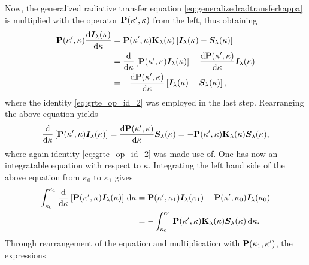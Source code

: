 \documentclass[a4paper,12pt]{report}
\begin{document}
Now, the generalized radiative transfer equation \cref{eq:generalizedradtransferkappa} is multiplied with the operator $\boldsymbol{\mathbf{P}}(\kappa^\prime, \kappa)$ from the left, thus obtaining \begin{align}
\begin{aligned}
\boldsymbol{\mathbf{P}}(\kappa^\prime,\kappa)\frac{\mathrm{d}\bm{I}_\lambda(\kappa)}{\mathrm{d}\kappa} &= \boldsymbol{\mathbf{P}}(\kappa^\prime,\kappa)\boldsymbol{\mathbf{K}}_\lambda(\kappa)\left[\bm{I}_\lambda(\kappa)-\bm{S}_\lambda(\kappa)\right] \\
&= \frac{\mathrm{d}}{\mathrm{d}\kappa}\left[\boldsymbol{\mathbf{P}}(\kappa^\prime,\kappa)\bm{I}_\lambda(\kappa)\right] - \frac{\mathrm{d}\boldsymbol{\mathbf{P}}(\kappa^\prime,\kappa)}{\mathrm{d}\kappa}\bm{I}_\lambda(\kappa) \\
&= -\frac{\mathrm{d}\boldsymbol{\mathbf{P}}(\kappa^\prime,\kappa)}{\mathrm{d}\kappa}\left[\bm{I}_\lambda(\kappa)-\bm{S}_\lambda(\kappa)\right],
\end{aligned}
\end{align} where the identity \cref{eq:grte_op_id_2} was employed in the last step. Rearranging the above equation yields \begin{align}
\begin{aligned}
\frac{\mathrm{d}}{\mathrm{d}\kappa}\left[\boldsymbol{\mathbf{P}}(\kappa^\prime,\kappa)\bm{I}_\lambda(\kappa)\right] = \frac{\mathrm{d}\boldsymbol{\mathbf{P}}(\kappa^\prime,\kappa)}{\mathrm{d}\kappa}\bm{S}_\lambda(\kappa) = -\boldsymbol{\mathbf{P}}(\kappa^\prime,\kappa)\boldsymbol{\mathbf{K}}_\lambda(\kappa)\bm{S}_\lambda(\kappa),
\end{aligned}
\end{align} where again identity \cref{eq:grte_op_id_2} was made use of. One has now an integratable equation with respect to $\kappa$. Integrating the left hand side of the above equation from $\kappa_0$ to $\kappa_1$ gives \begin{align}
\begin{aligned}
\int_{\kappa_0}^{\kappa_1}\frac{\mathrm{d}}{\mathrm{d}\kappa}\left[\boldsymbol{\mathbf{P}}(\kappa^\prime,\kappa)\bm{I}_\lambda(\kappa)\right]\,\mathrm{d}\kappa &= \boldsymbol{\mathbf{P}}(\kappa^\prime,\kappa_1)\bm{I}_\lambda(\kappa_1) - \boldsymbol{\mathbf{P}}(\kappa^\prime,\kappa_0)\bm{I}_\lambda(\kappa_0) \\
&= -\int_{\kappa_0}^{\kappa_1}\boldsymbol{\mathbf{P}}(\kappa^\prime,\kappa)\boldsymbol{\mathbf{K}}_\lambda(\kappa)\bm{S}_\lambda(\kappa)\,\mathrm{d}\kappa.
\end{aligned}
\end{align} Through rearrangement of the equation and multiplication with $\boldsymbol{\mathbf{P}}(\kappa_1,\kappa^\prime)$, the expressions \begin{align}

\end{align}
\end{document}

